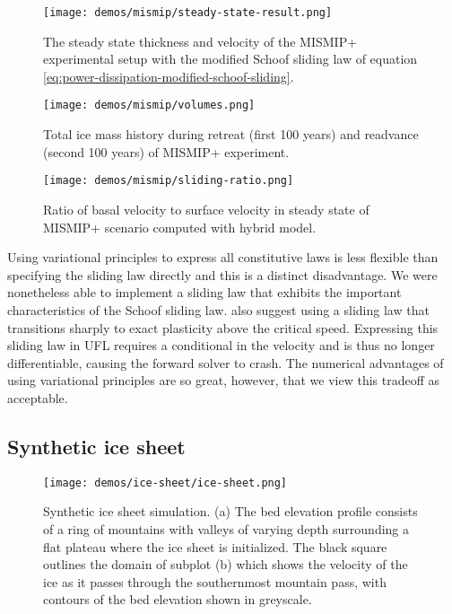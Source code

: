 \documentclass[journal abbreviation, manuscript]{copernicus}
\begin{document}
\begin{figure}[h]
    \texttt{[image: demos/mismip/steady-state-result.png]}
    \caption{The steady state thickness and velocity of the MISMIP+ experimental setup with the modified Schoof sliding law of equation \eqref{eq:power-dissipation-modified-schoof-sliding}.}
    \label{fig:mismip-result}
\end{figure}

\begin{figure}[h]
    \texttt{[image: demos/mismip/volumes.png]}
    \caption{Total ice mass history during retreat (first 100 years) and readvance (second 100 years) of MISMIP+ experiment.}
    \label{fig:mismip-volumes}
\end{figure}

\begin{figure}[h]
    \texttt{[image: demos/mismip/sliding-ratio.png]}
    \caption{Ratio of basal velocity to surface velocity in steady state of MISMIP+ scenario computed with hybrid model.}
    \label{fig:mismip-sliding-ratio}
\end{figure}

Using variational principles to express all constitutive laws is less flexible than specifying the sliding law directly and this is a distinct disadvantage.
We were nonetheless able to implement a sliding law that exhibits the important characteristics of the Schoof sliding law.
\citet{asay2016experimental} also suggest using a sliding law that transitions sharply to exact plasticity above the critical speed.
Expressing this sliding law in UFL requires a conditional in the velocity and is thus no longer differentiable, causing the forward solver to crash.
The numerical advantages of using variational principles are so great, however, that we view this tradeoff as acceptable.


\subsection{Synthetic ice sheet}

\begin{figure}[h]
    \texttt{[image: demos/ice-sheet/ice-sheet.png]}
    \caption{Synthetic ice sheet simulation. (a) The bed elevation profile consists of a ring of mountains with valleys of varying depth surrounding a flat plateau where the ice sheet is initialized.
    The black square outlines the domain of subplot (b) which shows the velocity of the ice as it passes through the southernmost mountain pass, with contours of the bed elevation shown in greyscale.}
    \label{fig:ice-sheet}
\end{figure}
\end{document}

